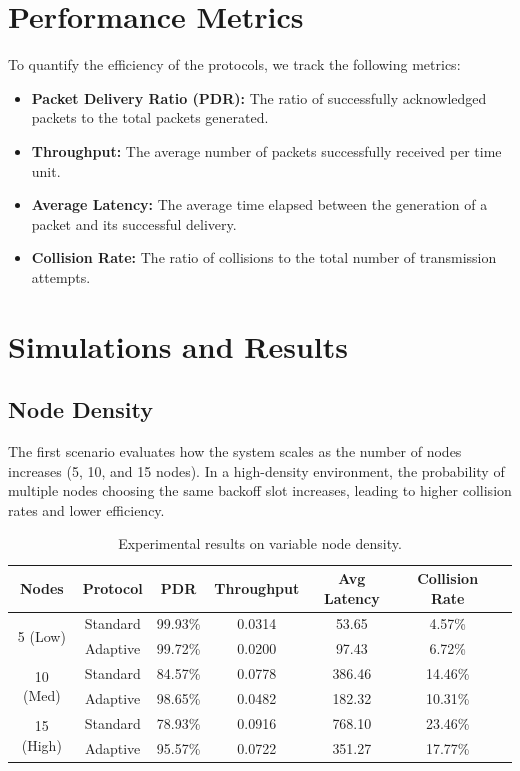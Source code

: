 \section{Performance Metrics}
To quantify the efficiency of the protocols, we track the following metrics:
\begin{itemize}
    \item \textbf{Packet Delivery Ratio (PDR):} The ratio of successfully acknowledged packets to the total packets generated.

    \item \textbf{Throughput:} The average number of packets successfully received per time unit.

    \item \textbf{Average Latency:} The average time elapsed between the generation of a packet and its successful delivery.

    \item \textbf{Collision Rate:} The ratio of collisions to the total number of transmission attempts.
\end{itemize}

\section{Simulations and Results}
\subsection{Node Density}
The first scenario evaluates how the system scales as the number of nodes increases (5, 10, and 15 nodes). In a high-density environment, the probability of multiple nodes choosing the same backoff slot increases, leading to higher collision rates and lower efficiency.

\begin{table}[ht]
    \centering
    \begin{tabular}{|c|c|c|c|c|c|c|}
    \hline
    \textbf{Nodes} & \textbf{Protocol} & \textbf{PDR} & \textbf{Throughput} & \textbf{Avg Latency} & \textbf{Collision Rate}
    \\\hline
    \multirow{2}{*}{5 (Low)} & Standard & 99.93\% & 0.0314 & 53.65 & 4.57\% \\\cline{2-6}
     & Adaptive & 99.72\% & 0.0200 & 97.43 & 6.72\% \\\hline
    \multirow{2}{*}{10 (Med)} & Standard & 84.57\% & 0.0778 & 386.46 & 14.46\% \\\cline{2-6}
     & Adaptive & 98.65\% & 0.0482 & 182.32 & 10.31\% \\\hline
    \multirow{2}{*}{15 (High)} & Standard & 78.93\% & 0.0916 & 768.10 & 23.46\% \\\cline{2-6}
     & Adaptive & 95.57\% & 0.0722 & 351.27 & 17.77\% \\\hline
    \end{tabular}
    \caption{Experimental results on variable node density.}
    \label{tab:node-density}
\end{table}

